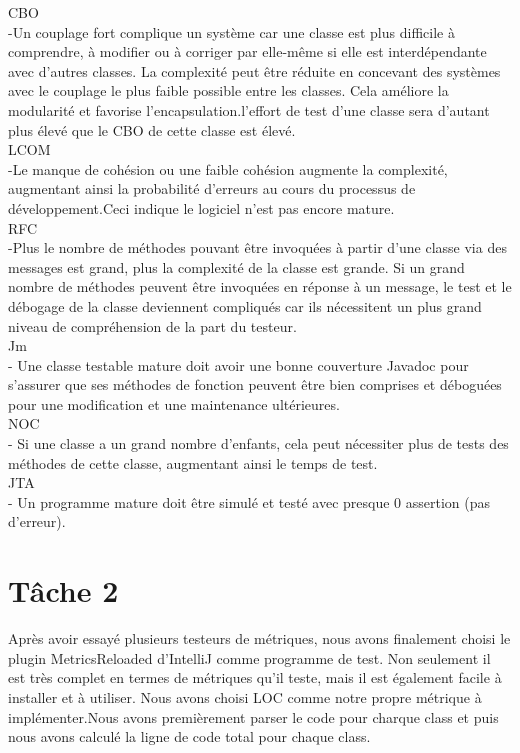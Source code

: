 \documentclass{article}
\begin{document}
CBO\\
-Un couplage fort complique un système car une classe est plus difficile à comprendre, à modifier ou à corriger par elle-même si elle est interdépendante avec d'autres classes. La complexité peut être réduite en concevant des systèmes avec le couplage le plus faible possible entre les classes. Cela améliore la modularité et favorise l'encapsulation.l'effort de test d'une classe sera d'autant plus élevé que le CBO de cette classe est élevé.\\
LCOM\\
-Le manque de cohésion ou une faible cohésion augmente la complexité, augmentant ainsi la probabilité d'erreurs au cours du processus de développement.Ceci indique le logiciel n'est pas encore mature. \\
RFC\\
-Plus le nombre de méthodes pouvant être invoquées à partir d'une classe via des messages est grand, plus la complexité de la classe est grande. Si un grand nombre de méthodes peuvent être invoquées en réponse à un message, le test et le débogage de la classe deviennent compliqués car ils nécessitent un plus grand niveau de compréhension de la part du testeur. \\
Jm\\
- Une classe testable mature doit avoir une bonne couverture Javadoc pour s'assurer que ses méthodes de fonction peuvent être bien comprises et déboguées pour une modification et une maintenance ultérieures.\\
NOC\\
- Si une classe a un grand nombre d'enfants, cela peut nécessiter plus de tests des méthodes de cette classe, augmentant ainsi le temps de test.\\
JTA\\
- Un programme mature doit être simulé et testé avec presque 0 assertion (pas d'erreur).\\

\section*{Tâche 2}
Après avoir essayé plusieurs testeurs de métriques, nous avons finalement choisi le plugin MetricsReloaded d'IntelliJ comme programme de test. Non seulement il est très complet en termes de métriques qu'il teste, mais il est également facile à installer et à utiliser. Nous avons choisi LOC comme notre propre métrique à implémenter.Nous avons premièrement parser le code pour charque class et puis nous avons calculé la ligne de code total pour chaque class.\\
\end{document}

